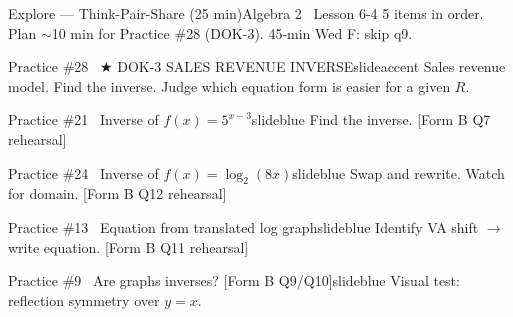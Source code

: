 \documentclass[aspectratio=169, 11pt]{beamer}
\begin{document}
\begin{frame}{Explore --- Think-Pair-Share (25 min)}{Algebra 2 \textperiodcentered\ Lesson 6-4}
\small\textcolor{slidegray}{5 items in order. Plan \(\sim\)10 min for Practice \#28 (DOK-3). 45-min Wed F: skip q9.}

\vspace{0.1cm}
\begin{projcard}{Practice \#28 \textperiodcentered\ \(\bigstar\) DOK-3 SALES REVENUE INVERSE}{slideaccent}
\small Sales revenue model. Find the inverse. Judge which equation form is easier for a given \(R\).
\end{projcard}
\vspace{-0.12cm}
\begin{projcard}{Practice \#21 \textperiodcentered\ Inverse of \(f(x) = 5^{x-3}\)}{slideblue}
\small Find the inverse. [Form B Q7 rehearsal]
\end{projcard}
\vspace{-0.12cm}
\begin{projcard}{Practice \#24 \textperiodcentered\ Inverse of \(f(x) = \log_2(8x)\)}{slideblue}
\small Swap and rewrite. Watch for domain. [Form B Q12 rehearsal]
\end{projcard}
\vspace{-0.12cm}
\begin{projcard}{Practice \#13 \textperiodcentered\ Equation from translated log graph}{slideblue}
\small Identify VA shift \(\rightarrow\) write equation. [Form B Q11 rehearsal]
\end{projcard}
\vspace{-0.12cm}
\begin{projcard}{Practice \#9 \textperiodcentered\ Are graphs inverses? [Form B Q9/Q10]}{slideblue}
\small Visual test: reflection symmetry over \(y = x\).
\end{projcard}
\end{frame}
\end{document}
